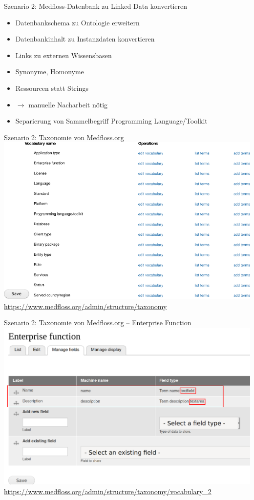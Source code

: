 \documentclass[aspectratio=1610,12pt]{beamer}
\begin{document}
\begin{frame}{Szenario 2: Medfloss-Datenbank zu Linked Data konvertieren}
\begin{spacing}{1.25}
\begin{itemize}
\item Datenbankschema zu Ontologie erweitern
\item Datenbankinhalt zu Instanzdaten konvertieren
\item Links zu externen Wissensbasen
\item Synonyme, Homonyme
\item Ressourcen statt Strings
\item $\rightarrow$ manuelle Nacharbeit nötig
\item Separierung von Sammelbegriff Programming Language/Toolkit
\end{itemize}
\end{spacing}
\end{frame}

\begin{frame}{Szenario 2: Taxonomie von Medfloss.org}
\centering
\includegraphics[height=.72\textheight]{img/medfloss-taxonomy.pdf}
\url{https://www.medfloss.org/admin/structure/taxonomy}
\end{frame}

\begin{frame}{Szenario 2: Taxonomie von Medfloss.org -- Enterprise Function}
\centering
\includegraphics[height=.72\textheight]{img/medfloss-function.png}
\url{https://www.medfloss.org/admin/structure/taxonomy/vocabulary_2}
\end{frame}
\end{document}
